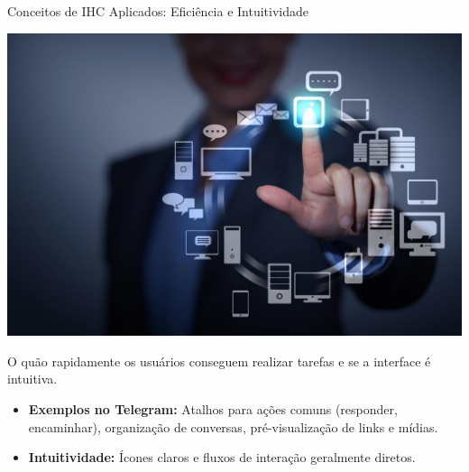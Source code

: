 \documentclass[aspectratio=169,xcolor=table]{beamer}
\begin{document}
\begin{frame}{Conceitos de IHC Aplicados: Eficiência e Intuitividade}
    \begin{center}
        \includegraphics[height=0.4\textheight]{telegram-chat.jpg}
    \end{center}
    
    O quão rapidamente os usuários conseguem realizar tarefas e se a interface é intuitiva.
    
    \begin{itemize}
        \item \textbf{Exemplos no Telegram:} Atalhos para ações comuns (responder, encaminhar), organização de conversas, pré-visualização de links e mídias.
        \item \textbf{Intuitividade:} Ícones claros e fluxos de interação geralmente diretos.
    \end{itemize}
\end{frame}
\end{document}

